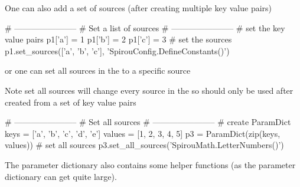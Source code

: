 \newpage

\noindent One can also add a set of sources (after creating multiple key value pairs)
\begin{pythonbox}
# -----------------------
# Set a list of sources
# -----------------------
# set the key value pairs
p1['a'] = 1
p1['b'] = 2
p1['c'] = 3
# set the sources
p1.set_sources(['a', 'b', 'c'], 'SpirouConfig.DefineConstants()')
\end{pythonbox}

\vspace{0.5cm}
\noindent or one can set all sources in the \ParamDict to a specific source
\begin{note}
Note set all sources will change every source in the \ParamDict so should only be used after \ParamDict created from a set of key value pairs
\end{note}

\begin{pythonbox}
# -----------------------
# Set all sources
# -----------------------
# create ParamDict
keys = ['a', 'b', 'c', 'd', 'e']
values = [1, 2, 3, 4, 5]
p3 = ParamDict(zip(keys, values))
# set all sources
p3.set_all_sources('SpirouMath.LetterNumbers()')
\end{pythonbox}

The parameter dictionary also contains some helper functions (as the parameter dictionary can get quite large).

